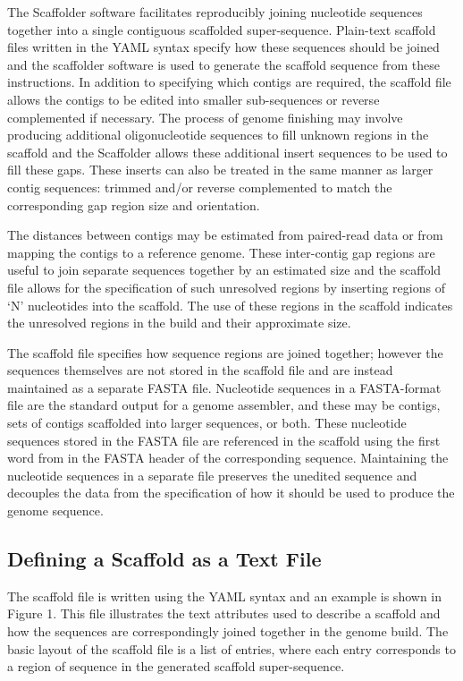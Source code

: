 \documentclass[10pt]{bmc_article}
\newenvironment{bmcformat}{\begin{raggedright}\baselineskip20pt\sloppy\setboolean{publ}{false}}{\end{raggedright}\baselineskip20pt\sloppy}
\begin{document}
\begin{bmcformat}
The Scaffolder software facilitates reproducibly joining nucleotide sequences
together into a single contiguous scaffolded super-sequence. Plain-text
scaffold files written in the YAML syntax specify how these sequences should
be joined and the scaffolder software is used to generate the scaffold
sequence from these instructions. In addition to specifying which contigs are
required, the scaffold file allows the contigs to be edited into smaller
sub-sequences or reverse complemented if necessary. The process of genome
finishing may involve producing additional oligonucleotide sequences to fill
unknown regions in the scaffold and the Scaffolder allows these additional
insert sequences to be used to fill these gaps. These inserts can also be
treated in the same manner as larger contig sequences: trimmed and/or reverse
complemented to match the corresponding gap region size and orientation. \pb

The distances between contigs may be estimated from paired-read data or from
mapping the contigs to a reference genome. These inter-contig gap regions are
useful to join separate sequences together by an estimated size and the
scaffold file allows for the specification of such unresolved regions by
inserting regions of `N' nucleotides into the scaffold. The use of these
regions in the scaffold indicates the unresolved regions in the build and their
approximate size. \pb

The scaffold file specifies how sequence regions are joined together; however
the sequences themselves are not stored in the scaffold file and are instead
maintained as a separate FASTA file. Nucleotide sequences in a FASTA-format
file are the standard output for a genome assembler, and these may be contigs,
sets of contigs scaffolded into larger sequences, or both. These nucleotide
sequences stored in the FASTA file are referenced in the scaffold using the
first word from in the FASTA header of the corresponding sequence. Maintaining
the nucleotide sequences in a separate file preserves the unedited sequence
and decouples the data from the specification of how it should be used to
produce the genome sequence. \pb

\subsection*{Defining a Scaffold as a Text File} %

The scaffold file is written using the YAML syntax and an example is shown in
Figure 1. This file illustrates the text attributes used to describe
a scaffold and how the sequences are correspondingly joined together in the
genome build. The basic layout of the scaffold file is a list of entries,
where each entry corresponds to a region of sequence in the generated scaffold
super-sequence. \pb


\end{bmcformat}
\end{document}
